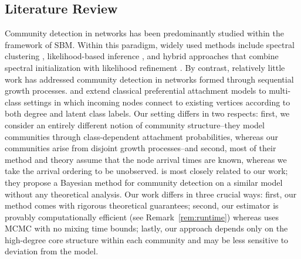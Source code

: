\documentclass[twoside,11pt]{article}
\theoremstyle{remark}
\begin{document}
\subsection{Literature Review}
Community detection in networks has been predominantly studied within the framework of SBM. 
Within this paradigm, widely used methods include spectral clustering \citep{amini2024hierarchical,li2022hierarchical}, likelihood-based inference \citep{zhen2023community,cerqueira2023pseudo}, and hybrid approaches that combine spectral initialization with likelihood refinement \citep{xu2020optimal,deng2024distributed}.
By contrast, relatively little work has addressed community detection in networks formed through sequential growth processes. \cite{ben2025inference} and \cite{hajek2019community} extend classical preferential attachment models to multi-class settings in which incoming nodes connect to existing vertices according to both degree and latent class labels. Our setting differs in two respects: first, we consider an entirely different notion of community structure--they model communities through class-dependent attachment probabilities, whereas our communities arise from disjoint growth processes--and second, most of their method and theory assume that the node arrival times are known, whereas we take the arrival ordering to be unobserved. \cite{crane2024root} is most closely related to our work; they propose a Bayesian method
for community detection on a similar model without any theoretical analysis. Our work differs in three crucial ways: first, our method comes with rigorous theoretical guarantees; second, our estimator is provably computationally efficient (see Remark~\ref{rem:runtime}) whereas \cite{crane2024root} uses MCMC with no mixing time bounds; lastly, our approach depends only on the high-degree core structure within each community and may be less sensitive to deviation from the model. 

\end{document}
